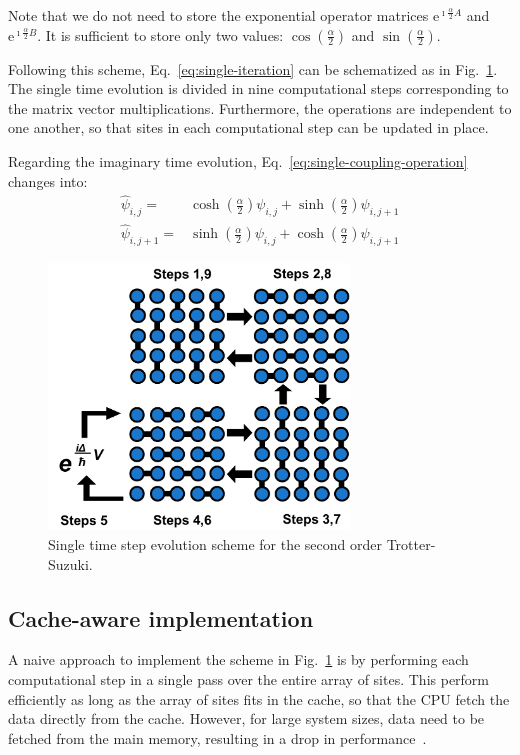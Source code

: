 Note that we do not need to store the exponential operator matrices $\mathrm{e}^{\imath \frac{\alpha}{2} A}$ and $\mathrm{e}^{\imath \frac{\alpha}{2} B}$. It is sufficient to store only two values: $ \cos\left(\frac{\alpha}{2}\right)$ and $\sin\left(\frac{\alpha}{2}\right)$.

Following this scheme, Eq.~\eqref{eq:single-iteration} can be schematized as in Fig.~\ref{fig:scheme-iteration}. The single time evolution is divided in nine computational steps corresponding to the matrix vector multiplications. Furthermore, the operations are independent to one another, so that sites in each computational step can be updated in place.

Regarding the imaginary time evolution, Eq.~\eqref{eq:single-coupling-operation} changes into:
\begin{align} \label{eq:single-coupling-operation-imag}
\hat{\psi}_{i,j} = & \cosh\left(\frac{\alpha}{2}\right) \psi_{i,j} + \sinh\left(\frac{\alpha}{2}\right) \psi_{i,j+1} \nonumber \\ 
\hat{\psi}_{i,j+1} = & \sinh\left(\frac{\alpha}{2}\right) \psi_{i,j} + \cosh\left(\frac{\alpha}{2}\right) \psi_{i,j+1} 
\end{align}
\begin{figure} 
   \centering
   \includegraphics[width=8cm]{Figs/Single_time_step_evolution.png}
   \caption{Single time step evolution scheme for the second order Trotter-Suzuki.} \label{fig:scheme-iteration}
\end{figure}

\subsection{Cache-aware implementation}
A naive approach to implement the scheme in Fig.~\ref{fig:scheme-iteration} is by performing each computational step in a single pass over the entire array of sites. This perform efficiently as long as the array of sites fits in the cache, so that the CPU fetch the data directly from the cache. However, for large system sizes, data need to be fetched from the main memory, resulting in a drop in performance~\citep{bederian2011boosting}. 

